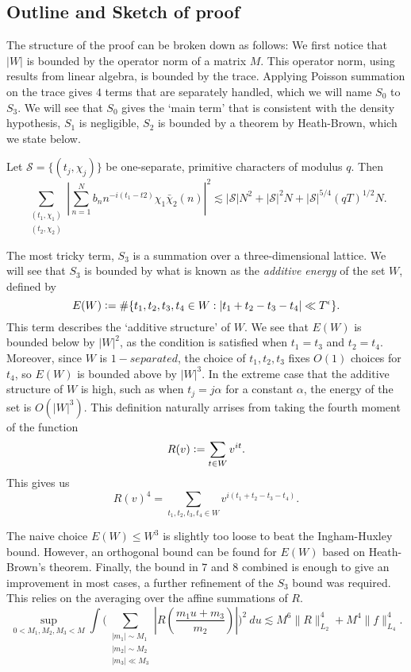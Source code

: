 \subsection{Outline and Sketch of proof}
The structure of the proof can be broken down as follows: We first notice that $|W|$ is bounded by the operator norm of a matrix $M$. This operator norm, using results from linear algebra, is bounded by the trace. Applying Poisson summation on the trace gives $4$ terms that are separately handled, which we will name $S_0$ to $S_3$. We will see that $S_0$ gives the `main term' that is consistent with the density hypothesis, $S_1$ is negligible, $S_2$ is bounded by a theorem by Heath-Brown, which we state below. 
\begin{theorem}
    \label{heathbrown}
    Let $\mathcal{S}=\{(t_j,\chi_j)\}$ be one-separate, primitive characters of modulus $q$. Then 
    \[
        \sum_{\substack{(t_1,\chi_1)\\(t_2,\chi_2)}}\left|\sum_{n=1}^{N} b_n n^{-i(t_1-t2)}\chi_1\bar{\chi}_2(n)\right|^2 \lesssim  |\mathcal{S}|N^2+ |\mathcal{S}|^2N + |\mathcal{S}|^{5/4}(qT)^{1/2}N.
    \]
\end{theorem}
The most tricky term, $S_3$ is a summation over a three-dimensional lattice. We will see that $S_3$ is bounded by what is known as the \textit{additive energy} of the set $W$, defined by\[
    E(W)\mathrel{\mathop:}= \#\{t_1,t_2,t_3,t_4\in W : |t_1+t_2-t_3-t_4|\ll T^\epsilon\}.
\]
This term describes the `additive structure' of $W$.
We see that $E(W)$ is bounded below by $|W|^2$, as the condition is satisfied when $t_1=t_3$ and $t_2=t_4$. Moreover, since $W$ is $1-separated$, the choice of $t_1,t_2,t_3$ fixes $O(1)$ choices for $t_4$, so $E(W)$ is bounded above by $|W|^3$. In the extreme case that the additive structure of $W$ is high, such as when $t_j=j\alpha$ for a constant $\alpha$, the energy of the set is $O(|W|^3)$. This definition naturally arrises from taking the fourth moment of the function \[
R(v)\mathrel{\mathop:}=\sum_{t\in W} v^{it}.
\] 
This gives us \[
R(v)^4=\sum_{t_1,t_2,t_3,t_4\in W}v^{i(t_1+t_2-t_3-t_4)}.
\]

The naive choice $E(W)\leq W^3$ is slightly too loose to beat the Ingham-Huxley bound. However, an orthogonal bound can be found for $E(W)$ based on Heath-Brown's theorem. Finally, the bound in $7$ and $8$ combined is enough to give an improvement in most cases, a further refinement of the $S_3$ bound was required. This relies on the averaging over the affine summations of $R$.
 \[
        \sup_{0<M_1,M_2,M_3<M} \int\Bigg( \sum_{\substack{|m_1|\sim M_1\\|m_2|\sim M_2 \\ |m_3|\ll M_3}} \left|R\left(\frac{m_1 u+m_3}{m_2}\right)\right|\Bigg)^2 \ du \lesssim M^6 \|R\|_{L_2}^4+M^4\|f\|_{L_4}^4.
\] 


